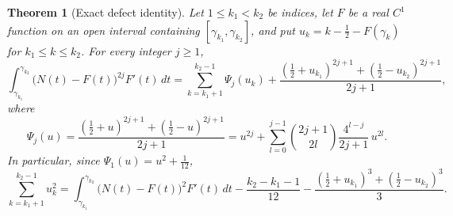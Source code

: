 \documentclass[11pt,a4paper]{article}
\numberwithin{equation}{section}
\newtheorem{theorem}{Theorem}[section]
\theoremstyle{definition}
\theoremstyle{remark}
\begin{document}
\begin{theorem}[Exact defect identity]\label{thm:identity}
Let $1\le k_1<k_2$ be indices, let $F$ be a real $C^1$ function on an open interval containing $[\gamma_{k_1},\gamma_{k_2}]$, and put $u_k=k-\frac12-F(\gamma_k)$ for $k_1\le k\le k_2$. For every integer $j\ge1$,
\begin{equation}
\int_{\gamma_{k_1}}^{\gamma_{k_2}}\bigl(N(t)-F(t)\bigr)^{2j}F'(t)\,dt=\sum_{k=k_1+1}^{k_2-1}\Psi_j(u_k)+\frac{(\frac12+u_{k_1})^{2j+1}+(\frac12-u_{k_2})^{2j+1}}{2j+1},
\label{eq:identity_general}
\end{equation}
where
\begin{equation}
\Psi_j(u)=\frac{(\frac12+u)^{2j+1}+(\frac12-u)^{2j+1}}{2j+1}=u^{2j}+\sum_{l=0}^{j-1}\binom{2j+1}{2l}\frac{4^{l-j}}{2j+1}\,u^{2l}.
\label{eq:Psi_def}
\end{equation}
In particular, since $\Psi_1(u)=u^2+\frac1{12}$,
\begin{equation}
\sum_{k=k_1+1}^{k_2-1}u_k^2=\int_{\gamma_{k_1}}^{\gamma_{k_2}}\bigl(N(t)-F(t)\bigr)^2F'(t)\,dt-\frac{k_2-k_1-1}{12}-\frac{(\frac12+u_{k_1})^3+(\frac12-u_{k_2})^3}3 .
\label{eq:identity_quadratic}
\end{equation}
\end{theorem}
\end{document}
